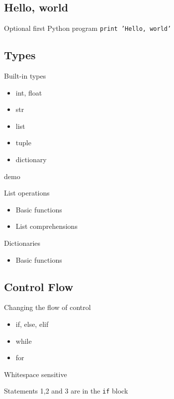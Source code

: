 \documentclass{beamer}
\begin{document}
  \subsection{Hello, world}
  \begin{frame} {Optional first Python program}
   \large{\texttt{print 'Hello, world'}} \\
  \end{frame}
  \subsection{Types}
\begin{frame} {Built-in types}
 \begin{itemize}
  \item int, float
  \item str
  \item list
  \item tuple
  \item dictionary
 \end{itemize}
\end{frame}
 \begin{frame}
  \begin{center}
   \huge{demo}
  \end{center}
 \end{frame}
\begin{frame} {List operations}
 \begin{itemize}
  \item Basic functions
  \item List comprehensions
 \end{itemize}
 \end{frame}
  \begin{frame} {Dictionaries}
 \begin{itemize}
  \item Basic functions 
 \end{itemize}
  \end{frame}
\subsection{Control Flow}
\begin{frame} {Changing the flow of control}
 \begin{itemize}
  \item if, else, elif
  \item while
  \item for
 \end{itemize}
\end{frame}
\begin{frame} {Whitespace sensitive}
 \begin{center} 
 \end{center}
 Statements 1,2 and 3 are in the \texttt{if} block
\end{frame}
\end{document}
